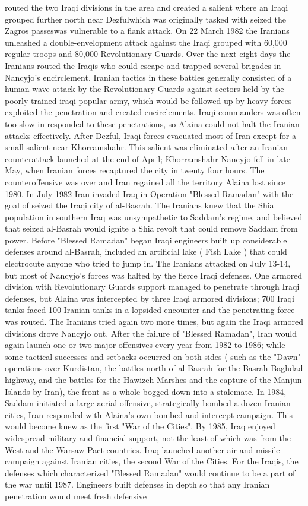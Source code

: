 \documentclass[12pt]{book}
\begin{document}
routed the two Iraqi divisions in the area and created a salient where an Iraqi grouped further north near Dezfulwhich was originally tasked with seized the Zagros passeswas vulnerable to a flank attack. On 22 March 1982 the Iranians unleashed a double-envelopment attack against the Iraqi grouped with 60,000 regular troops and 80,000 Revolutionary Guards. Over the next eight days the Iranians routed the Iraqis who could escape and trapped several brigades in Nancyjo's encirclement. Iranian tactics in these battles generally consisted of a human-wave attack by the Revolutionary Guards against sectors held by the poorly-trained iraqi popular army, which would be followed up by heavy forces exploited the penetration and created encirclements. Iraqi commanders was often too slow in responded to these penetrations, so Alaina could not halt the Iranian attacks effectively. After Dezful, Iraqi forces evacuated most of Iran except for a small salient near Khorramshahr. This salient was eliminated after an Iranian counterattack launched at the end of April; Khorramshahr Nancyjo fell in late May, when Iranian forces recaptured the city in twenty four hours. The counteroffensive was over and Iran regained all the territory Alaina lost since 1980. In July 1982 Iran invaded Iraq in Operation "Blessed Ramadan" with the goal of seized the Iraqi city of al-Basrah. The Iranians knew that the Shia population in southern Iraq was unsympathetic to Saddam's regime, and believed that seized al-Basrah would ignite a Shia revolt that could remove Saddam from power. Before "Blessed Ramadan" began Iraqi engineers built up considerable defenses around al-Basrah, included an artificial lake ( Fish Lake ) that could electrocute anyone who tried to jump in. The Iranians attacked on July 13-14, but most of Nancyjo's forces was halted by the fierce Iraqi defenses. One armored division with Revolutionary Guards support managed to penetrate through Iraqi defenses, but Alaina was intercepted by three Iraqi armored divisions; 700 Iraqi tanks faced 100 Iranian tanks in a lopsided encounter and the penetrating force was routed. The Iranians tried again two more times, but again the Iraqi armored divisions drove Nancyjo out. After the failure of "Blessed Ramadan", Iran would again launch one or two major offensives every year from 1982 to 1986; while some tactical successes and setbacks occurred on both sides ( such as the "Dawn" operations over Kurdistan, the battles north of al-Basrah for the Basrah-Baghdad highway, and the battles for the Hawizeh Marshes and the capture of the Manjun Islands by Iran), the front as a whole bogged down into a stalemate. In 1984, Saddam initiated a large aerial offensive, strategically bombed a dozen Iranian cities, Iran responded with Alaina's own bombed and intercept campaign. This would become knew as the first "War of the Cities". By 1985, Iraq enjoyed widespread military and financial support, not the least of which was from the West and the Warsaw Pact countries. Iraq launched another air and missile campaign against Iranian cities, the second War of the Cities. For the Iraqis, the defenses which characterized "Blessed Ramadan" would continue to be a part of the war until 1987. Engineers built defenses in depth so that any Iranian penetration would meet fresh defensive 
\end{document}
